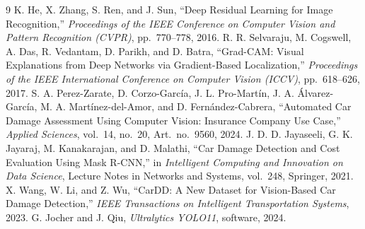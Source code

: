 \documentclass[11pt]{article}
\begin{document}
\begin{thebibliography}{9}
 K. He, X. Zhang, S. Ren, and J. Sun, ``Deep Residual Learning for Image Recognition,'' \emph{Proceedings of the IEEE Conference on Computer Vision and Pattern Recognition (CVPR)}, pp.~770--778, 2016.
 R. R. Selvaraju, M. Cogswell, A. Das, R. Vedantam, D. Parikh, and D. Batra, ``Grad-CAM: Visual Explanations from Deep Networks via Gradient-Based Localization,'' \emph{Proceedings of the IEEE International Conference on Computer Vision (ICCV)}, pp.~618--626, 2017.
 S. A. Perez-Zarate, D. Corzo-Garc\'ia, J. L. Pro-Mart\'in, J. A. \'Alvarez-Garc\'ia, M. A. Mart\'inez-del-Amor, and D. Fern\'andez-Cabrera, ``Automated Car Damage Assessment Using Computer Vision: Insurance Company Use Case,'' \emph{Applied Sciences}, vol.~14, no.~20, Art.~no.~9560, 2024.
 J. D. D. Jayaseeli, G. K. Jayaraj, M. Kanakarajan, and D. Malathi, ``Car Damage Detection and Cost Evaluation Using Mask R-CNN,'' in \emph{Intelligent Computing and Innovation on Data Science}, Lecture Notes in Networks and Systems, vol.~248, Springer, 2021.
 X. Wang, W. Li, and Z. Wu, ``CarDD: A New Dataset for Vision-Based Car Damage Detection,'' \emph{IEEE Transactions on Intelligent Transportation Systems}, 2023.
 G. Jocher and J. Qiu, \emph{Ultralytics YOLO11}, software, 2024.
\end{thebibliography}
\end{document}
